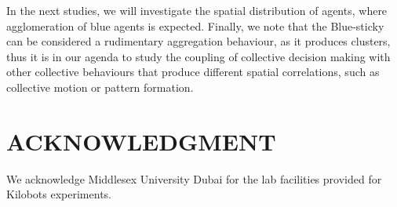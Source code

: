 \documentclass[sigconf]{acmart}
\begin{document}
In the next studies, we will investigate the spatial distribution of agents, where agglomeration of blue agents is expected.  Finally, we note that the Blue-sticky can be considered a rudimentary aggregation behaviour, as it produces clusters, thus it is in our agenda to study the coupling of collective decision making with other collective behaviours that produce different spatial correlations, such as collective motion or pattern formation. 




\section*{ACKNOWLEDGMENT}

We acknowledge Middlesex University Dubai for the lab facilities provided for Kilobots experiments.



\end{document}
